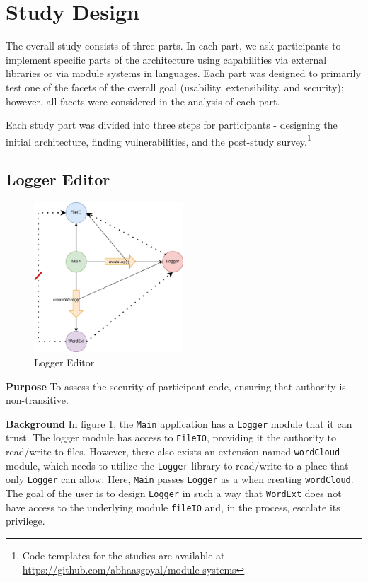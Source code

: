 \section{Study Design}\label{sec-content}
\noindent
The overall study consists of three parts. In each part, we ask participants to implement specific parts of the architecture using capabilities via external libraries or via module systems in languages. Each part was designed to primarily test one of the facets of the overall goal (usability, extensibility, and security); however, all facets were considered in the analysis of each part.

Each study part was divided into three steps for participants - designing the initial architecture, finding vulnerabilities, and the post-study survey.\footnote{Code templates for the studies are available at \url{https://github.com/abhaasgoyal/module-systems}} 

\subsection{Logger Editor} \label{sec:loggerEditor}
\begin{figure}[htbp]
\centering
\includegraphics[width=2.2in]{figures/Ambient_logger.jpg}
\caption{Logger Editor}
\label{loggerEditor}
\end{figure}
\noindent
\textbf{Purpose} To assess the security of participant code, ensuring that authority is non-transitive.

\noindent
\textbf{Background} In figure \ref{loggerEditor}, the \texttt{Main} application has a \texttt{Logger} module that it can trust. The logger module has access to \texttt{FileIO}, providing it the authority to read/write to files. However, there also exists an extension named \texttt{wordCloud} module, which needs to utilize the \texttt{Logger} library to read/write to a place that only \texttt{Logger} can allow. Here, \texttt{Main} passes \texttt{Logger} as a when creating \texttt{wordCloud}. The goal of the user is to design \texttt{Logger} in such a way that \texttt{WordExt} does not have access to the underlying module \texttt{fileIO} and, in the process, escalate its privilege.

